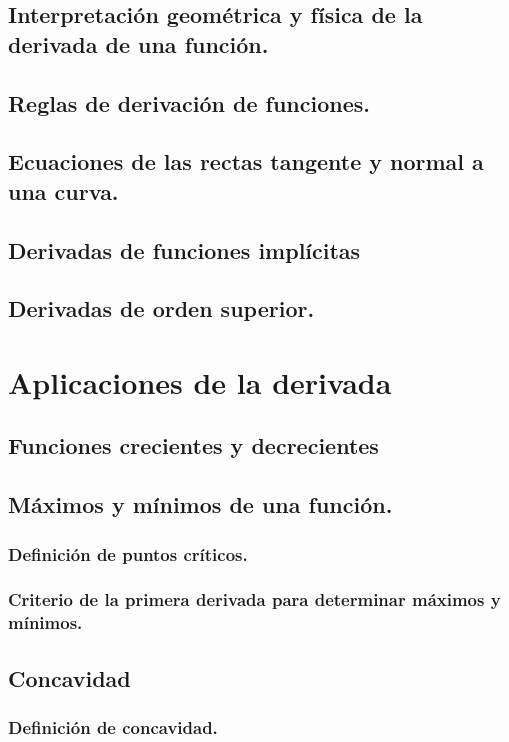 \subsection{Interpretación geométrica y física de la derivada de una función.}
\subsection{Reglas de derivación de funciones.}
\subsection{Ecuaciones de las rectas tangente y normal a una curva.}
\subsection{Derivadas de funciones implícitas}
\subsection{Derivadas de orden superior.}








\section{Aplicaciones de la derivada} %
\subsection{Funciones crecientes y decrecientes}
\subsection{Máximos y mínimos de una función.}
\subsubsection{Definición de puntos críticos.}
\subsubsection{Criterio de la primera derivada para determinar máximos y mínimos.}
\subsection{Concavidad} 
\subsubsection{Definición de concavidad.}

